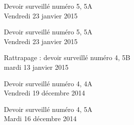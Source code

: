 \documentclass[a4paper,10pt]{article}
\begin{document}





\begin{feuilleDS}{Devoir surveillé numéro 5, 5A\\ \small Vendredi 23 janvier 2015}
\end{feuilleDS}

\begin{feuilleDS}{Devoir surveillé numéro 5, 5A\\ \small Vendredi 23 janvier 2015}
\end{feuilleDS}




\begin{feuilleDS}{Rattrapage : devoir surveillé numéro 4, 5B\\ \small mardi 13 janvier 2015}
\end{feuilleDS}


\begin{feuilleDS}{Devoir surveillé numéro 4, 4A\\ \small Vendredi 19 décembre 2014}

\end{feuilleDS}


\begin{feuilleDS}{Devoir surveillé numéro 4, 5A\\ \small Mardi 16 décembre 2014}
\end{feuilleDS}
\end{document}
